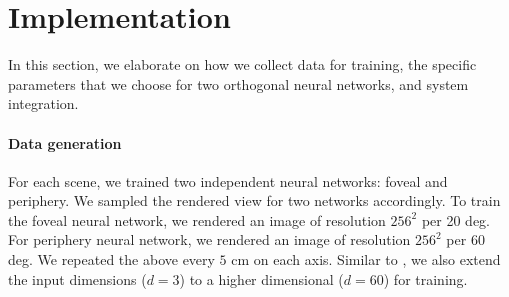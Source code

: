 \section{Implementation}\label{sec:impl}
In this section, we elaborate on how we collect data for training, the specific parameters that we choose for two orthogonal neural networks, and system integration.

\paragraph{Data generation}
For each scene, we trained two independent neural networks: foveal and periphery. We sampled the rendered view for two networks accordingly. To train the foveal neural network, we rendered an image of resolution $256^2$ per 20 deg. For periphery neural network, we rendered an image of resolution $256^2$ per $60$ deg. We repeated the above every $5$ cm on each axis.
Similar to \cite{mildenhall2020nerf}, we also extend the input dimensions ($d=3$) to a higher dimensional ($d=60$) for training. 
